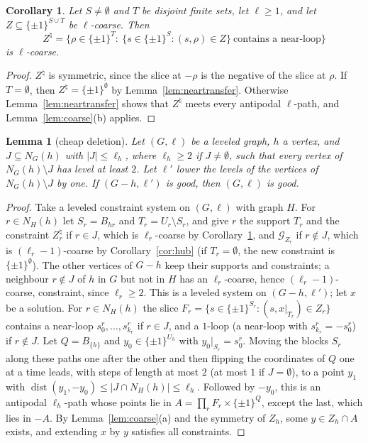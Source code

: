 \documentclass[11pt,letterpaper]{article}
\newtheorem{lemma}[theorem]{Lemma}
\newtheorem{corollary}[theorem]{Corollary}
\theoremstyle{definition}
\newcommand{\cG}{\mathcal{G}}
\newcommand{\cube}[1]{\{\pm1\}^{#1}}
\DeclareMathOperator{\dist}{dist}
\begin{document}
\begin{corollary}\label{cor:neartransfer}
Let $S\ne\emptyset$ and $T$ be disjoint finite sets, let $\ell\ge1$, and let
$Z\subseteq\cube{S\cup T}$ be $\ell$-coarse. Then
\[
  Z^\natural=\bigl\{\rho\in\cube T:\ \{s\in\cube S:(s,\rho)\in Z\}\ \text{contains a near-loop}\bigr\}
\]
is $\ell$-coarse.
\end{corollary}

\begin{proof}
$Z^\natural$ is symmetric, since the slice at $-\rho$ is the negative of the slice at $\rho$. If
$T=\emptyset$, then $Z^\natural=\cube\emptyset$ by Lemma~\ref{lem:neartransfer}. Otherwise
Lemma~\ref{lem:neartransfer} shows that $Z^\natural$ meets every antipodal $\ell$-path, and
Lemma~\ref{lem:coarse}(b) applies.
\end{proof}

\begin{lemma}[cheap deletion]\label{lem:cheap}
Let $(G,\ell)$ be a leveled graph, $h$ a vertex, and $J\subseteq N_G(h)$ with $|J|\le\ell_h$, where
$\ell_h\ge2$ if $J\ne\emptyset$, such that every vertex of $N_G(h)\setminus J$ has level at least $2$.
Let $\ell'$ lower the levels of the vertices of $N_G(h)\setminus J$ by one. If $(G-h,\ell')$ is good, then
$(G,\ell)$ is good.
\end{lemma}

\begin{proof}
Take a leveled constraint system on $(G,\ell)$ with graph $H$. For $r\in N_H(h)$ let $S_r=B_{hr}$ and
$T_r=U_r\setminus S_r$, and give $r$ the support $T_r$ and the constraint $Z_r^\natural$ if $r\in J$, which
is $\ell_r$-coarse by Corollary~\ref{cor:neartransfer}, and $\cG_{Z_r}$ if $r\notin J$, which is
$(\ell_r-1)$-coarse by Corollary~\ref{cor:hub} (if $T_r=\emptyset$, the new constraint is $\cube\emptyset$).
The other vertices of $G-h$ keep their supports and constraints; a neighbour $r\notin J$ of $h$ in $G$ but
not in $H$ has an $\ell_r$-coarse, hence $(\ell_r-1)$-coarse, constraint, since $\ell_r\ge2$. This is a
leveled system on $(G-h,\ell')$; let $x$ be a solution. For $r\in N_H(h)$ the slice
$F_r=\{s\in\cube{S_r}:(s,x|_{T_r})\in Z_r\}$ contains a near-loop $s^r_0,\dots,s^r_{k_r}$ if $r\in J$, and a
$1$-loop (a near-loop with $s^r_{k_r}=-s^r_0$) if $r\notin J$. Let $Q=B_{\{h\}}$ and $y_0\in\cube{U_h}$
with $y_0|_{S_r}=s^r_0$. Moving the blocks $S_r$ along these paths one after the other and then flipping
the coordinates of $Q$ one at a time leads, with steps of length at most $2$ (at most $1$ if
$J=\emptyset$), to a point $y_1$ with $\dist(y_1,-y_0)\le|J\cap N_H(h)|\le\ell_h$. Followed by $-y_0$, this
is an antipodal $\ell_h$-path whose points lie in $A=\prod_rF_r\times\cube Q$, except the last, which lies
in $-A$. By Lemma~\ref{lem:coarse}(a) and the symmetry of $Z_h$, some $y\in Z_h\cap A$ exists, and
extending $x$ by $y$ satisfies all constraints.
\end{proof}
\end{document}
